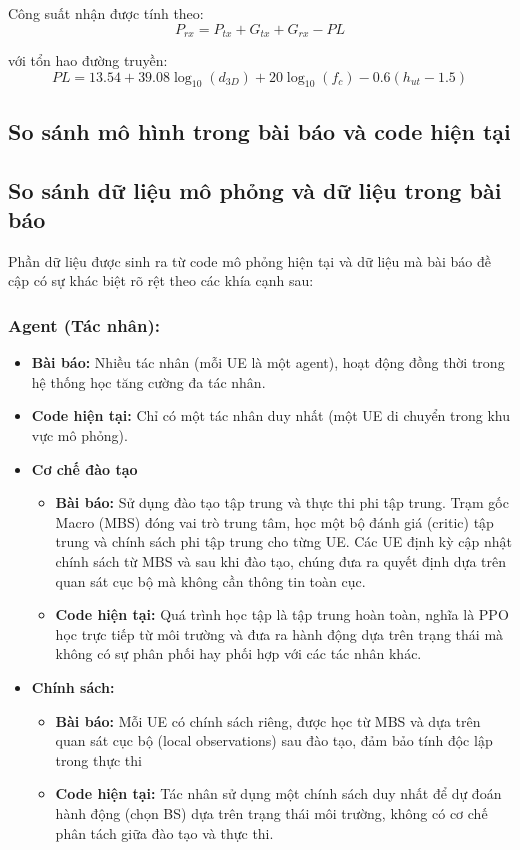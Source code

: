 \documentclass{article} %
\begin{document}
Công suất nhận được tính theo:
$$P_{rx} = P_{tx} + G_{tx} + G_{rx} - PL$$

với tổn hao đường truyền:
$$PL = 13.54 + 39.08 \log_{10}(d_{3D}) + 20 \log_{10}(f_c) - 0.6(h_{ut} - 1.5)$$
\subsection{So sánh mô hình trong bài báo và code hiện tại}
\subsection{So sánh dữ liệu mô phỏng và dữ liệu trong bài báo}

Phần dữ liệu được sinh ra từ code mô phỏng hiện tại và dữ liệu mà bài báo đề cập có sự khác biệt rõ rệt theo các khía cạnh sau:
    \subsubsection{Agent (Tác nhân):}
    \begin{itemize}
        \item \textbf{Bài báo:} Nhiều tác nhân (mỗi UE là một agent), hoạt động đồng thời trong hệ thống học tăng cường đa tác nhân.
        \item \textbf{Code hiện tại:} Chỉ có một tác nhân duy nhất (một UE di chuyển trong khu vực mô phỏng).
    \end{itemize}
    \begin{itemize}
    \item \textbf{Cơ chế đào tạo}
    \begin{itemize}
        \item \textbf{Bài báo:} Sử dụng đào tạo tập trung và thực thi phi tập trung. Trạm gốc Macro (MBS) đóng vai trò trung tâm, học một bộ đánh giá (critic) tập trung và chính sách phi tập trung cho từng UE. Các UE định kỳ cập nhật chính sách từ MBS và sau khi đào tạo, chúng đưa ra quyết định dựa trên quan sát cục bộ mà không cần thông tin toàn cục.
        \item \textbf{Code hiện tại:} Quá trình học tập là tập trung hoàn toàn, nghĩa là PPO học trực tiếp từ môi trường và đưa ra hành động dựa trên trạng thái mà không có sự phân phối hay phối hợp với các tác nhân khác.
    \end{itemize}
    \item \textbf{Chính sách:}
    \begin{itemize}
        \item \textbf{Bài báo:} Mỗi UE có chính sách riêng, được học từ MBS và dựa trên quan sát cục bộ (local observations) sau đào tạo, đảm bảo tính độc lập trong thực thi
        \item \textbf{Code hiện tại:} Tác nhân sử dụng một chính sách duy nhất để dự đoán hành động (chọn BS) dựa trên trạng thái môi trường, không có cơ chế phân tách giữa đào tạo và thực thi.
    \end{itemize}
    \end{itemize}
\end{document}

